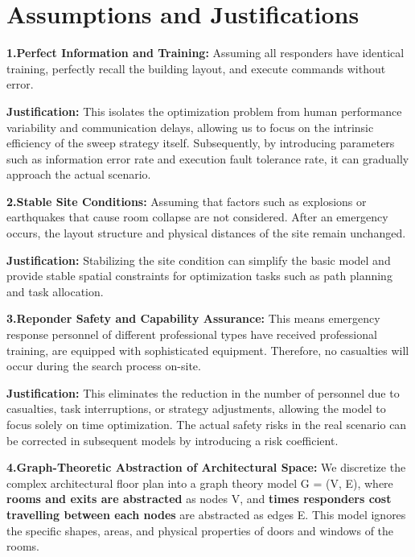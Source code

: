 \section{Assumptions and Justifications}
\vspace{-0.3cm}%


\textbf{1.Perfect Information and Training:} Assuming all responders have identical training, perfectly recall the building layout, and execute commands without error.

   \textbf{    Justification:} This isolates the optimization problem from human performance variability and communication delays, allowing us to focus on the intrinsic efficiency of the sweep strategy itself. Subsequently, by introducing parameters such as information error rate and execution fault tolerance rate, it can gradually approach the actual scenario.


\textbf{2.Stable Site Conditions:} Assuming that factors such as explosions or earthquakes that cause room collapse are not considered. After an emergency occurs, the layout structure and physical distances of the site remain unchanged.

\textbf{Justification:} Stabilizing the site condition can simplify the basic model and provide stable spatial constraints for optimization tasks such as path planning and task allocation.


\textbf{3.Reponder Safety and Capability Assurance:} This means emergency response personnel of different professional types have received professional training, are equipped with sophisticated equipment. Therefore, no casualties will occur during the search process on-site.

\textbf{Justification:} This eliminates the reduction in the number of personnel due to casualties, task interruptions, or strategy adjustments, allowing the model to focus solely on time optimization. The actual safety risks in the real scenario can be corrected in subsequent models by introducing a risk coefficient.


\textbf{4.Graph-Theoretic Abstraction of Architectural Space:} We discretize the complex architectural floor plan into a graph theory model G = (V, E), where \textbf{rooms and exits are abstracted} as nodes V, and\textbf{ times responders cost travelling between each nodes} are abstracted as edges E. This model ignores the specific shapes, areas, and physical properties of doors and windows of the rooms.

